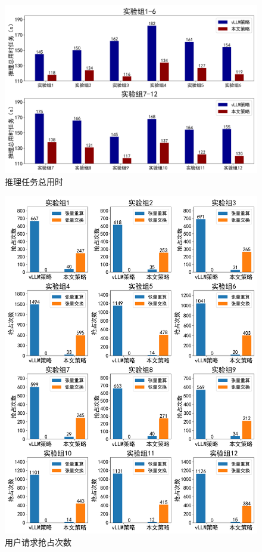 \documentclass[a4paper, nosysfonts]{hpcchina}
\begin{document}
\begin{figure}[!htbp]
  \centering
  \includegraphics[width=1\linewidth]
  {推理任务总用时.png}
  \caption{推理任务总用时}
  \label{推理任务总用时}
\end{figure}

\begin{figure}[!htbp]
  \centering
  \includegraphics[width=1\linewidth]
  {用户请求抢占次数.png}
  \caption{用户请求抢占次数}
  \label{用户请求抢占次数}
\end{figure}
\end{document}
